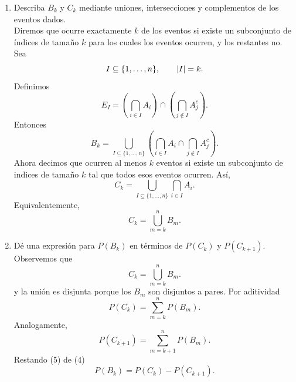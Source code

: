 \documentclass[12pt,a4paper]{article}
\begin{document}
    \begin{solucion}
        \begin{enumerate}
            \item[(a)] Describa $B_k$ y $C_k$ mediante uniones, intersecciones y complementos de los eventos dados.\\
            Diremos que ocurre exactamente $k$ de los eventos si existe un subconjunto  de índices de tamaño $k$ para los
            cuales los eventos ocurren, y los restantes no. Sea
            \begin{equation*}
                I\subseteq\{1,\dots,n\},\qquad\abs{I}=k.
            \end{equation*}
            Definimos
            \begin{equation*}
                E_{I}=\left(\bigcap_{i\in I}A_{i}\right)\cap\left(\bigcap_{j\notin I}A_{j}^{c}\right).
            \end{equation*}
            Entonces
            \begin{equation*}
                B_{k}=\bigcup_{I\subseteq\{1,\dots,n\}}\left(\bigcap_{i\in I}A_{i}\cap\bigcap_{j\notin I}A_{j}^{c}\right).
            \end{equation*}
            Ahora decimos que ocurren al menos $k$ eventos si existe un subconjunto de indices de tamaño $k$ tal que
            todos esos eventos ocurren. Así,
            \begin{equation*}
                C_{k}=\bigcup_{I\subseteq\{1,\dots,n\}}\bigcap_{i\in I}A_{i}.
            \end{equation*}
            Equivalentemente,
            \begin{equation*}
                C_{k}=\bigcup_{m=k}^{n}B_{m}.
            \end{equation*}
            \item[(b)] Dé una expresión para $P(B_k)$ en términos de $P(C_k)$ y $P(C_{k+1})$.\\
            Observemos que
            \begin{equation*}
                C_{k}=\bigcup_{m=k}^{n}B_{m}.
            \end{equation*}
            y la unión es disjunta porque los $B_{m}$ son disjuntos a pares. Por aditividad
            \begin{equation}
                P(C_{k})=\sum_{m=k}^{n}P(B_{m}).
            \end{equation}
            Analogamente,
            \begin{equation}
                P(C_{k+1})=\sum_{m=k+1}^{n}P(B_{m}).
            \end{equation}
            Restando (5) de (4)
            \begin{equation*}
                P(B_{k})=P(C_{k})-P(C_{k+1}).
            \end{equation*}
        \end{enumerate}
    \end{solucion}
\end{document}
